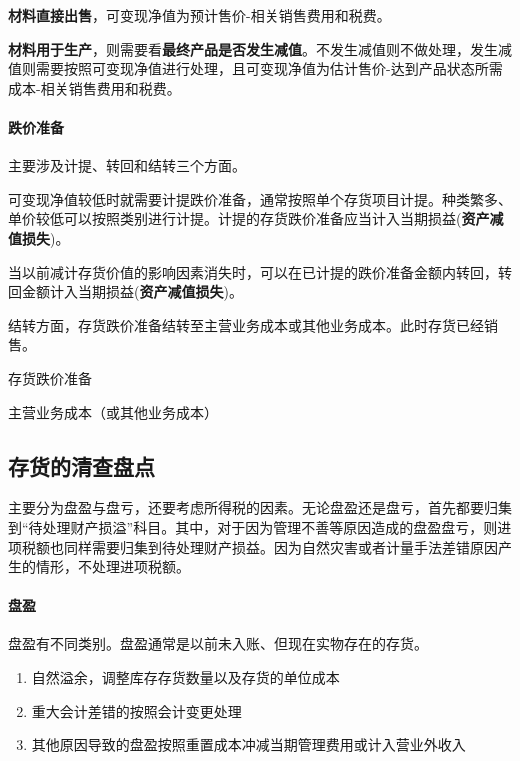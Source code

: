 \documentclass[UTF8,12pt]{ctexart}
\newenvironment{Dr}{%
	\begin{list}{}%
		{
			\setlength{\leftmargin}{2em}
			\setlength{\labelwidth}{2em}
			\setlength{\labelsep}{0pt}
			\setlength{\itemindent}{0pt}
			\setlength{\listparindent}{0pt}
			\setlength{\parsep}{0pt}
			\setlength{\topsep}{0pt}
		}
		\item[\textbf{借：}]
	}{%
	\end{list}
}
\newenvironment{Cr}{%
	\begin{list}{}%
		{
			\setlength{\leftmargin}{3em}
			\setlength{\labelwidth}{2em}
			\setlength{\labelsep}{0pt}
			\setlength{\itemindent}{0pt}
			\setlength{\listparindent}{0pt}
			\setlength{\parsep}{0pt}
			\setlength{\topsep}{0pt}
		}
		\item[\textbf{贷：}]
	}{%
	\end{list}
}
\numberwithin{equation}{section} %
\numberwithin{figure}{section}
\numberwithin{table}{section}
\begin{document}
	\textbf{材料直接出售}，可变现净值为预计售价-相关销售费用和税费。
	
	\textbf{材料用于生产}，则需要看\textbf{最终产品是否发生减值}。不发生减值则不做处理，发生减值则需要按照可变现净值进行处理，且可变现净值为估计售价-达到产品状态所需成本-相关销售费用和税费。
	
	\paragraph{跌价准备} 主要涉及计提、转回和结转三个方面。
	
	可变现净值较低时就需要计提跌价准备，通常按照单个存货项目计提。种类繁多、单价较低可以按照类别进行计提。计提的存货跌价准备应当计入当期损益(\textbf{资产减值损失})。
	
	当以前减计存货价值的影响因素消失时，可以在已计提的跌价准备金额内转回，转回金额计入当期损益(\textbf{资产减值损失})。
	
	结转方面，存货跌价准备结转至主营业务成本或其他业务成本。此时存货已经销售。
	\begin{Dr}
		存货跌价准备
	\end{Dr}
	\begin{Cr}
		主营业务成本（或其他业务成本）
	\end{Cr}
	
	\subsection{存货的清查盘点}
	
	主要分为盘盈与盘亏，还要考虑所得税的因素。无论盘盈还是盘亏，首先都要归集到“待处理财产损溢”科目。其中，对于因为管理不善等原因造成的盘盈盘亏，则进项税额也同样需要归集到待处理财产损益。因为自然灾害或者计量手法差错原因产生的情形，不处理进项税额。
	
	\paragraph{盘盈} 盘盈有不同类别。盘盈通常是以前未入账、但现在实物存在的存货。
	\begin{enumerate}
		\item 自然溢余，调整库存存货数量以及存货的单位成本
		
		\item 重大会计差错的按照会计变更处理
		
		\item 其他原因导致的盘盈按照重置成本冲减当期管理费用或计入营业外收入
	\end{enumerate}
	
\end{document}
